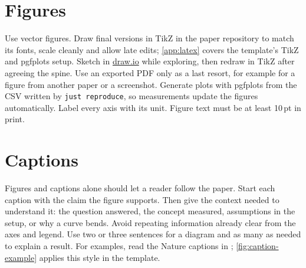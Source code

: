 \section{Figures}\label{app:writing:figures}
Use vector figures. Draw final versions in TikZ in the paper repository to match its fonts, scale cleanly and allow late edits; \cref{app:latex} covers the template's TikZ and pgfplots setup. Sketch in \href{https://www.drawio.com/}{draw.io} while exploring, then redraw in TikZ after agreeing the spine. Use an exported PDF only as a last resort, for example for a figure from another paper or a screenshot. Generate plots with pgfplots from the CSV written by \texttt{just reproduce}, so measurements update the figures automatically. Label every axis with its unit. Figure text must be at least 10\,pt in print.

\section{Captions}\label{app:writing:captions}
Figures and captions alone should let a reader follow the paper. Start each caption with the claim the figure supports. Then give the context needed to understand it: the question answered, the concept measured, assumptions in the setup, or why a curve bends. Avoid repeating information already clear from the axes and legend. Use two or three sentences for a diagram and as many as needed to explain a result. For examples, read the Nature captions in \citet{guide:gulyas2015navigable}; \cref{fig:caption-example} applies this style in the template.

